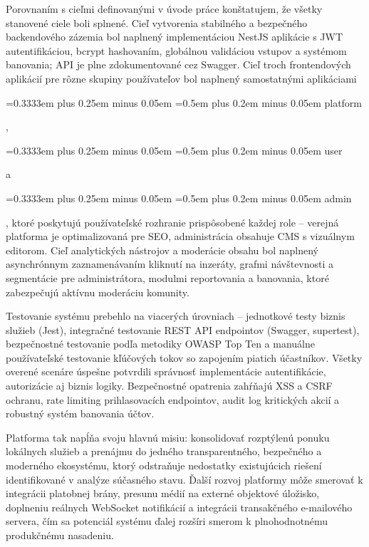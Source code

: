 \documentclass[12pt]{article}
\newcommand{\hlcode}[1]{%
  \allowbreak
  \begingroup
  \setlength{\fboxsep}{2.4pt}%
  \setlength{\fboxrule}{0pt}%
  \colorbox{gray!15}{%
    \strut
    {\ttfamily\small
     \hyphenpenalty=10000
     \exhyphenpenalty=10000
     \spaceskip=0.3333em plus 0.25em minus 0.05em
     \xspaceskip=0.5em plus 0.2em minus 0.05em
     #1}%
  }%
  \endgroup
  \allowbreak
}
\begin{document}
Porovnaním s cieľmi definovanými v úvode práce konštatujem, že všetky stanovené ciele boli splnené. Cieľ vytvorenia stabilného a bezpečného backendového zázemia bol naplnený implementáciou NestJS aplikácie s JWT autentifikáciou, bcrypt hashovaním, globálnou validáciou vstupov a systémom banovania; API je plne zdokumentované cez Swagger. Cieľ troch frontendových aplikácií pre rôzne skupiny používateľov bol naplnený samostatnými aplikáciami \hlcode{platform}, \hlcode{user} a \hlcode{admin}, ktoré poskytujú používateľské rozhranie prispôsobené každej role -- verejná platforma je optimalizovaná pre SEO, administrácia obsahuje CMS s vizuálnym editorom. Cieľ analytických nástrojov a moderácie obsahu bol naplnený asynchrónnym zaznamenávaním kliknutí na inzeráty, grafmi návštevnosti a segmentácie pre administrátora, modulmi reportovania a banovania, ktoré zabezpečujú aktívnu moderáciu komunity.

Testovanie systému prebehlo na viacerých úrovniach -- jednotkové testy biznis služieb (Jest), integračné testovanie REST API endpointov (Swagger, supertest), bezpečnostné testovanie podľa metodiky OWASP Top Ten a manuálne používateľské testovanie kľúčových tokov so zapojením piatich účastníkov. Všetky overené scenáre úspešne potvrdili správnosť implementácie autentifikácie, autorizácie aj biznis logiky. Bezpečnostné opatrenia zahŕňajú XSS a CSRF ochranu, rate limiting prihlasovacích endpointov, audit log kritických akcií a robustný systém banovania účtov.

Platforma tak napĺňa svoju hlavnú misiu: konsolidovať rozptýlenú ponuku lokálnych služieb a prenájmu do jedného transparentného, bezpečného a moderného ekosystému, ktorý odstraňuje nedostatky existujúcich riešení identifikované v analýze súčasného stavu. Ďalší rozvoj platformy môže smerovať k integrácii platobnej brány, presunu médií na externé objektové úložisko, doplneniu reálnych WebSocket notifikácií a integrácii transakčného e-mailového servera, čím sa potenciál systému ďalej rozšíri smerom k plnohodnotnému produkčnému nasadeniu.

\par


\newpage
\printbibliography[title={Použitá literatúra},heading=bibintoc]

% 

\label{LastPage}
\end{document}
